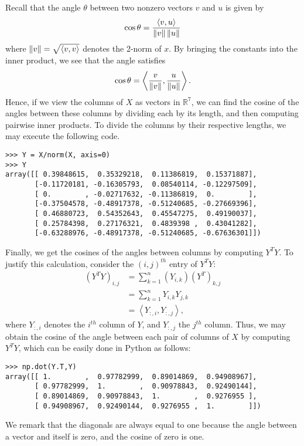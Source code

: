Recall that the angle $\theta$ between two nonzero
vectors $v$ and $u$ is given by
\[
\cos{\theta} = \frac{\langle v,u \rangle}{\left\lVert v\right\rVert\left\lVert u\right\rVert}
\]
where $\left\lVert v\right\rVert = \sqrt{\langle v,v \rangle}$ denotes the 2-norm of $x$.
By bringing the constants into the inner product, we see that the angle satisfies
\[
\cos{\theta} = \left\langle\frac{v}{\left\lVert v\right\rVert},\frac{u}{\left\lVert u\right\rVert}\right\rangle.
\]
Hence, if we view the columns of $X$ as vectors in $\mathbb{R}^7$, we can find the cosine of the angles between these columns by dividing each
by its length, and then computing pairwise inner products. 
To divide the columns by their respective lengths, we may execute the following code.
\begin{lstlisting}
>>> Y = X/norm(X, axis=0)
>>> Y
array([[ 0.39848615,  0.35329218,  0.11386819,  0.15371887],
       [-0.11720181, -0.16305793,  0.08540114, -0.12297509],
       [ 0.        , -0.02717632, -0.11386819,  0.        ],
       [-0.37504578, -0.48917378, -0.51240685, -0.27669396],
       [ 0.46880723,  0.54352643,  0.45547275,  0.49190037],
       [ 0.25784398,  0.27176321,  0.4839398 ,  0.43041282],
       [-0.63288976, -0.48917378, -0.51240685, -0.67636301]])
\end{lstlisting}

Finally, we get the cosines of the angles between columns by computing $Y^T Y$. To justify this calculation, consider
the $(i,j)^{th}$ entry of $Y^T Y$:
\begin{align*}
(Y^T Y)_{i,j} &= \sum_{k=1}^n (Y_{i,k})(Y^T)_{k,j} \\
&= \sum_{k=1}^n Y_{i,k}Y_{j,k} \\
&= \left\langle Y_{:,i}, Y_{:,j} \right\rangle,
\end{align*}
where $Y_{:,i}$ denotes the $i^{th}$ column of $Y$, and $Y_{:,j}$ the $j^{th}$ column.
Thus, we may obtain the cosine of the angle between each pair of columns of $X$ by computing $Y^T Y$,
which can be easily done in Python as follows:
\begin{lstlisting}
>>> np.dot(Y.T,Y)
array([[ 1.        ,  0.97782999,  0.89014869,  0.94908967],
       [ 0.97782999,  1.        ,  0.90978843,  0.92490144],
       [ 0.89014869,  0.90978843,  1.        ,  0.9276955 ],
       [ 0.94908967,  0.92490144,  0.9276955 ,  1.        ]])
\end{lstlisting}

We remark that the diagonals are always equal to one because the angle between a vector and itself is zero, and the cosine of zero is one.


